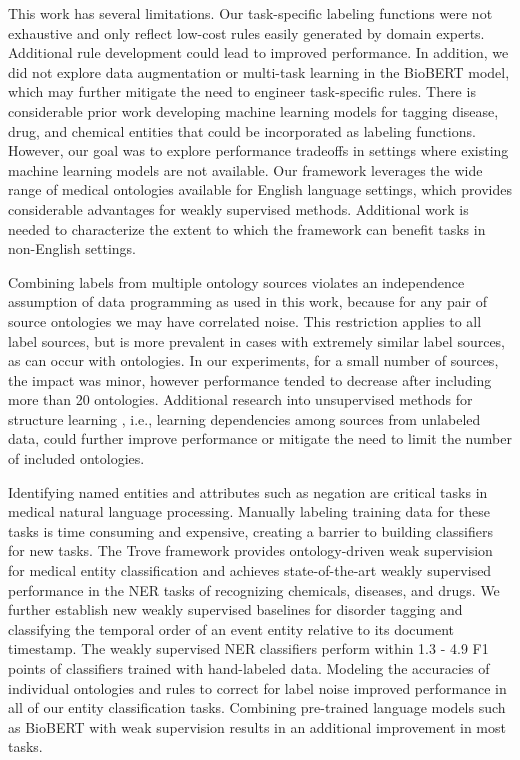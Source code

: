 \documentclass{article}
\begin{document}
This work has several limitations.
Our task-specific labeling functions were not exhaustive and only reflect low-cost rules easily generated by domain experts. 
Additional rule development could lead to improved performance. 
In addition, we did not explore data augmentation or multi-task learning in the BioBERT model, which may further mitigate the need to engineer task-specific rules. 
There is considerable prior work developing machine learning models for tagging disease, drug, and chemical entities that could be incorporated as labeling functions.
However, our goal was to explore performance tradeoffs in settings where existing machine learning models are not available. 
Our framework leverages the wide range of medical ontologies available for English language settings, which provides considerable advantages for weakly supervised methods. 
Additional work is needed to characterize the extent to which the framework can benefit tasks in non-English settings. 

Combining labels from multiple ontology sources violates an independence assumption of data programming as used in this work, because for any pair of source ontologies we may have correlated noise.
This restriction applies to all label sources, but is more prevalent in cases with extremely similar label sources, as can occur with ontologies. 
In our experiments, for a small number of sources, the impact was minor, however performance tended to decrease after including more than 20 ontologies. 
Additional research into unsupervised methods for structure learning \cite{Bach2017-yt,Varma2019-lx}, i.e., learning dependencies among sources from unlabeled data, could further improve performance or mitigate the need to limit the number of included ontologies.  

Identifying named entities and attributes such as negation are critical tasks in medical natural language processing. 
Manually labeling training data for these tasks is time consuming and expensive, creating a barrier to building classifiers for new tasks. 
The Trove framework provides ontology-driven weak supervision for medical entity classification and achieves state-of-the-art weakly supervised performance in the NER tasks of recognizing chemicals, diseases, and drugs.
We further establish new weakly supervised baselines for disorder tagging and classifying the temporal order of an event entity relative to its document timestamp.
The weakly supervised NER classifiers perform within {1.3 - 4.9} F1 points of classifiers trained with hand-labeled data. 
Modeling the accuracies of individual ontologies and rules to correct for label noise improved performance in all of our entity classification tasks. 
Combining pre-trained language models such as BioBERT with weak supervision results in an additional improvement in most tasks.
\end{document}
